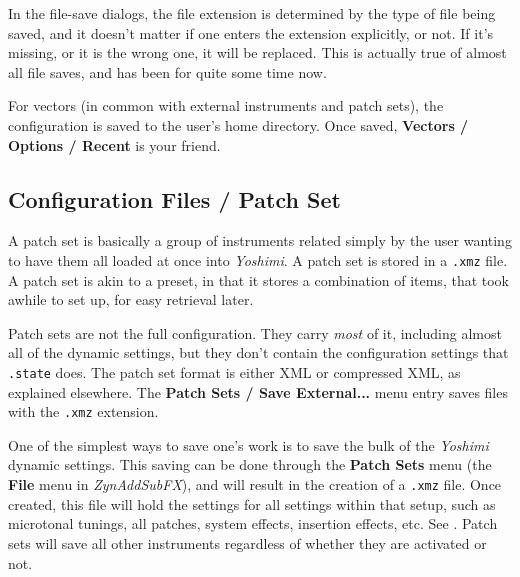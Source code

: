    In the file-save dialogs, the file extension is determined by the type of
   file being saved, and it doesn't matter if one enters the extension
   explicitly, or not. If it's missing, or it is the wrong one, it will be
   replaced. This is actually true of almost all file saves, and has been for
   quite some time now.

   For vectors (in common with external instruments and patch sets),
   the configuration is saved to the user's home directory.
   Once saved, \textbf{Vectors / Options / Recent} is your friend.


\subsection{Configuration Files / Patch Set}
\label{subsec:configuration_patch_set}

   A patch set is basically a group of instruments related simply by the user
   wanting to have them all loaded at once into \textsl{Yoshimi}.  A patch set
   is stored in a \texttt{.xmz} file.  A patch set is akin to a preset, in that
   it stores a combination of items, that took awhile to set up, for easy
   retrieval later.

   Patch sets are not the full configuration. They carry \textsl{most} of it,
   including almost all of the dynamic settings, but they don't contain the
   configuration settings that \texttt{.state} does.  The patch set format is
   either XML or compressed XML, as explained elsewhere.  The
   \textbf{Patch Sets / Save External...} menu entry saves files with
   the \texttt{.xmz} extension.

   One of the simplest ways to save one's work is to save the bulk of the
\textsl{Yoshimi} dynamic settings.
   This saving can be done through the \textbf{Patch Sets} menu
   (the \textbf{File} menu in \textsl{ZynAddSubFX}),
   and will result in the creation of
   a \texttt{.xmz} file. Once created, this file will hold the settings for
   all settings within that setup, such as microtonal tunings, all
   patches, system effects, insertion effects, etc.
   See .
   Patch sets will save all other instruments regardless of whether they are
   activated or not.

